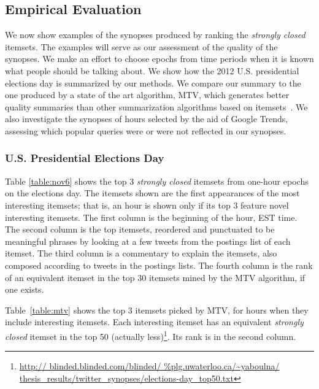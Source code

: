 \documentclass{sig-alternate}
\begin{document}
\subsection{Empirical Evaluation}
\label{sec:empirical}
We now show examples of the synopses produced by ranking
the \emph{strongly closed} itemsets. %
The examples will serve as our assessment of the quality of 
the synopses. 
We make an effort to choose epochs from time periods when 
it is known what people should be talking about. 
We show how the 2012 U.S. presidential elections day is summarized by our methods. %
We compare our summary to the one produced by a state of the art algorithm, MTV,
which generates better quality summaries than other summarization algorithms based on itemsets~\cite{mampaey2011tell}. 
We also investigate the synopses of hours selected by the aid of Google Trends,
assessing which popular queries were or were not reflected in our synopses.

\subsubsection{U.S. Presidential Elections Day}
Table \ref{table:nov6} shows the top 3 \emph{strongly closed} itemsets
from one-hour epochs on the elections day.
The itemsets shown are the first appearances of the most interesting itemsets;
that is, an hour is shown only if its top 3 feature novel interesting itemsets.
The first column is the beginning of the hour, EST time.
The second column is the top itemsets, 
reordered and punctuated to be meaningful phrases 
by looking at a few tweets from the postings list of each itemset.
The third column is a commentary to explain the itemsets,
also composed according to tweets in the postings lists.
The fourth column is the rank of an equivalent itemset 
in the top 30 itemsets mined by the MTV algorithm, if one exists.

Table~\ref{table:mtv} shows the top 3 itemsets picked by MTV, 
for hours when they include interesting itemsets.
Each interesting itemset has
an equivalent \emph{strongly closed} itemset in the top 50 (actually less)\footnote{\scriptsize \url{http://
blinded.blinded.com/blinded/
thesis_results/twitter_synopses/elections-day_top50.txt}}.
Its rank is in the second column.
\end{document}
